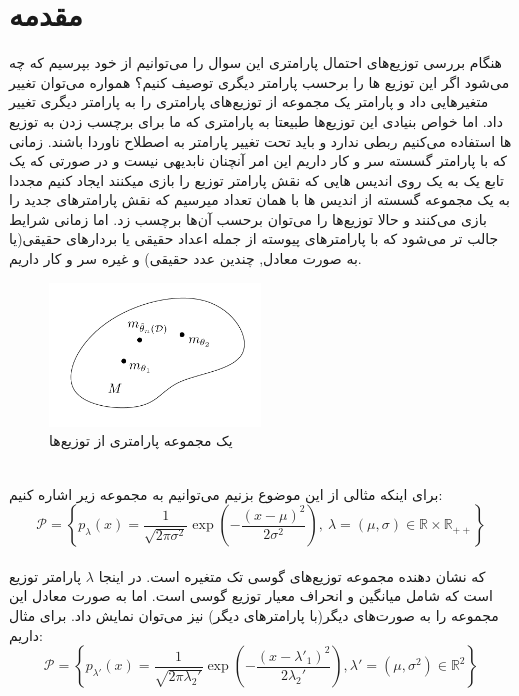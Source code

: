 \section{مقدمه}
هنگام بررسی توزیع‌های احتمال پارامتری این سوال را می‌توانیم از خود بپرسیم که چه می‌شود اگر این توزیع ها را برحسب پارامتر دیگری توصیف کنیم؟ همواره می‌توان تغییر متغیرهایی داد و پارامتر یک مجموعه از توزیع‌های پارامتری را به پارامتر دیگری تغییر داد. اما خواص بنیادی این توزیع‌ها طبیعتا به پارامتری که ما برای برچسب زدن به توزیع ها استفاده می‌کنیم ربطی ندارد و باید تحت تغییر پارامتر به اصطلاح ناوردا باشند. زمانی که با پارامتر گسسته سر و کار داریم این امر آنچنان نابدیهی نیست و در صورتی که یک تابع یک به یک روی اندیس هایی که نقش پارامتر توزیع را بازی میکنند ایجاد کنیم مجددا به یک مجموعه گسسته از اندیس ها با همان تعداد میرسیم که نقش پارامترهای جدید را بازی می‌کنند و حالا توزیع‌ها را می‌توان برحسب آن‌ها برچسب زد. اما زمانی شرایط جالب تر می‌شود که با پارامترهای پیوسته از جمله اعداد حقیقی یا بردارهای حقیقی(یا به صورت معادل, چندین عدد حقیقی) و غیره سر و کار داریم.\\
\begin{figure}[h!]
    \centering
    \includegraphics[width=0.5\textwidth]{Pictures/Q1/1.png}
    \caption{یک مجموعه پارامتری از توزیع‌ها}
\end{figure}\\
برای اینکه مثالی از این موضوع بزنیم می‌توانیم به مجموعه زیر اشاره کنیم:\\
\begin{equation}
    \mathcal{P}=\left\{ p_\lambda(x)=\frac{1}{\sqrt{2\pi \sigma^2}}\exp\left(-\frac{(x-\mu)^2}{2\sigma^2}\right),\ \lambda=(\mu,\sigma)\in \mathbb{R}\times \mathbb{R}_{++} \right\}
\end{equation}\\
که نشان دهنده مجموعه توزیع‌های گوسی تک‌ متغیره است. در اینجا $\lambda$ پارامتر توزیع‌ است که شامل میانگین و انحراف معیار توزیع گوسی است. اما به صورت معادل این مجموعه را به صورت‌های دیگر(با پارامترهای دیگر) نیز می‌توان نمایش داد. برای مثال داریم:
\begin{equation}
    \mathcal{P}=\left\{p_{\lambda'}(x)=\frac{1}{\sqrt{2\pi\lambda_2'}}\exp\left(-\frac{(x-\lambda'_1)^2}{2\lambda_2'}\right), \lambda'=(\mu, \sigma
    ^2)\in\mathbb{R}^2\right\}
\end{equation}\\
